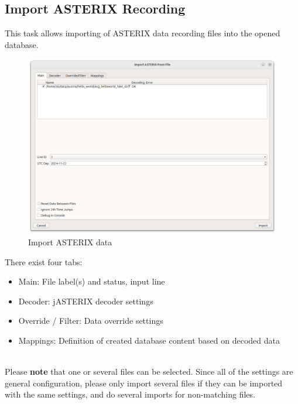 \subsection{Import ASTERIX Recording}
\label{sec:ui_import_asterix}

This task allows importing of ASTERIX data recording files into the opened database. \\

\begin{figure}[H]
  \center
    \hspace*{-0.5cm}
    \includegraphics[width=17cm]{figures/asterix_import_data.png}
  \caption{Import ASTERIX data}
\end{figure}

There exist four tabs:

\begin{itemize}
\item Main: File label(s) and status, input line
\item Decoder: jASTERIX decoder settings
\item Override / Filter: Data override settings
\item Mappings: Definition of created database content based on decoded data
\end{itemize}
\ \\

Please \textbf{note} that one or several files can be selected. Since all of the settings are general configuration, please only import several files if they can be imported with the same settings, and do several imports for non-matching files. \\

